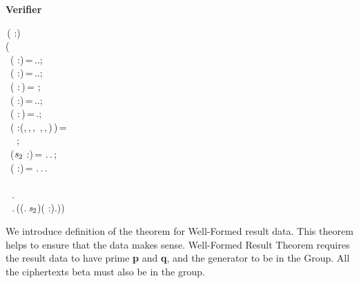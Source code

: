 \textbf{Verifier}
\begin{holmath}
    \,( :)\,\HOLSymConst{\HOLTokenEquiv{}}\\
(\\
\,\,\,( :)\,=\,..;\\
\,\,\,( :)\,=\,..;\\
\,\,\,( :\,)\,=\,\,;\\
\,\,\,( :)\,=\,..;\\
\,\,\,( :\,)\,=\,.;\\
\,\,\,( :(,\,,\,,\,\,\HOLTokenProd{}\,,\,,\,)\,)\,=\\
\,\,\,\,\,\,\,;\\
\,\,\,(\ensuremath{\HOLBoundVar{s}\sb{\mathrm{2}}} :)\,=\,\,.\,.\,;\\
\,\,\,( :)\,=\,\,.\,.\,.\\
\,\\
\,\,\,\,.\,\HOLSymConst{\HOLTokenGeq{}}\,\,\,\\
\,\,\,\,.\,((\HOLSymConst{,}.\,\ensuremath{\HOLBoundVar{s}\sb{\mathrm{2}}})\HOLSymConst{,}\HOLSymConst{,}( :)\HOLSymConst{,}.))
\end{holmath}  

We introduce definition of the theorem for Well-Formed result data. 
This theorem helps to ensure that the data makes sense. 
Well-Formed Result Theorem requires the result data to have prime \textbf{p} and \textbf{q}, and the generator to be in the Group. 
All the ciphertexts beta must also be in the group.

